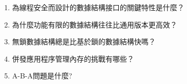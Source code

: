 \begin{enumerate}
\item 
為線程安全而設計的數據結構接口的關鍵特性是什麼？

\item 
為什麼功能有限的數據結構往往比通用版本更高效？

\item 
無鎖數據結構總是比基於鎖的數據結構快嗎？

\item
併發應用程序管理內存的挑戰有哪些？

\item
A-B-A問題是什麼?
\end{enumerate}